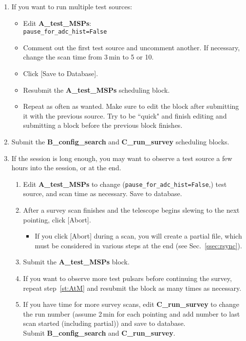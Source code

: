 \documentclass[11pt]{article}
\begin{document}
\begin{enumerate}
 \item If you want to run multiple test sources: \begin{itemize}
  \item Edit \textbf{A\_test\_MSPs}: \\
  \texttt{pause\_for\_adc\_hist=False} 
  \item Comment out the first test source and uncomment another.  If necessary, change the scan time from 3\,min to 5 or 10.  
  \item Click [Save to Database].
  \item Resubmit the \textbf{A\_test\_MSPs} scheduling block. 
  \item Repeat as often as wanted.  Make sure to edit the block after submitting it with the previous source.  Try to be ``quick" and finish editing and submitting a block before the previous block finishes.  \end{itemize}

 \item Submit the \textbf{B\_config\_search} and \textbf{C\_run\_survey} scheduling blocks. 
 
 \item If the session is long enough, you may want to observe a test source a few hours into the session, or at the end.  \begin{enumerate}
  \item\label{st:AtM} Edit \textbf{A\_test\_MSPs} to change (\texttt{pause\_for\_adc\_hist=False},) test source, and scan time as necessary.  Save to database.
  \item After a survey scan finishes and the telescope begins slewing to the next pointing, click [Abort].  \begin{itemize}
   \item If you click [Abort] during a scan, you will create a partial file, which must be considered in various steps at the end (see Sec.~\ref{ssec:rsync}). \end{itemize}
  \item Submit the \textbf{A\_test\_MSPs} block.  
  \item If you want to observe more test pulsars before continuing the survey, repeat step~\ref{st:AtM} and resubmit the block as many times as necessary. 
  \item If you have time for more survey scans, edit \textbf{C\_run\_survey} to change the run number (assume 2\,min for each pointing and add number to last scan started (including partial)) and save to database. \\
  Submit \textbf{B\_config\_search} and \textbf{C\_run\_survey}. 
 \end{enumerate}
\end{enumerate}
\end{document}
